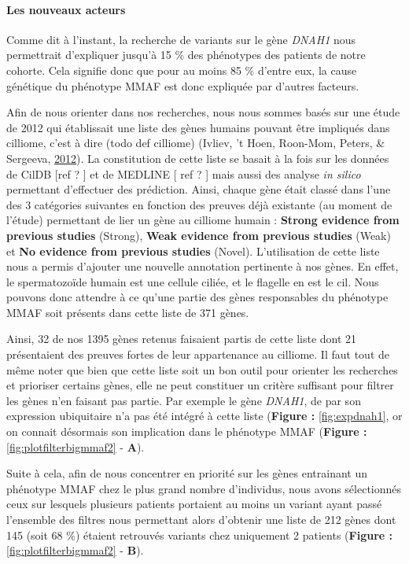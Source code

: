 \documentclass[12pt,twoside]{reedthesis}
\theoremstyle{definition}
\theoremstyle{definition}
\theoremstyle{remark}
\begin{document}
  \paragraph{Les nouveaux acteurs}\label{les-nouveaux-acteurs}
  
  Comme dit à l'instant, la recherche de variants sur le gène \emph{DNAH1}
  nous permettrait d'expliquer jusqu'à 15 \% des phénotypes des patients
  de notre cohorte. Cela signifie donc que pour au moins 85 \% d'entre
  eux, la cause génétique du phénotype MMAF est donc expliquée par
  d'autres facteurs.
  
  Afin de nous orienter dans nos recherches, nous nous sommes basés sur
  une étude de 2012 qui établissait une liste des gènes humains pouvant
  être impliqués dans cilliome, c'est à dire (todo def cilliome) (Ivliev,
  't Hoen, Roon-Mom, Peters, \& Sergeeva,
  \protect\hyperlink{ref-Ivliev2012}{2012}). La constitution de cette
  liste se basait à la fois sur les données de CilDB {[}ref ? {]} et de
  MEDLINE {[} ref ? {]} mais aussi des analyse \emph{in silico} permettant
  d'effectuer des prédiction. Ainsi, chaque gène était classé dans l'une
  des 3 catégories suivantes en fonction des preuves déjà existante (au
  moment de l'étude) permettant de lier un gène au cilliome humain :
  \textbf{Strong evidence from previous studies} (Strong), \textbf{Weak
  evidence from previous studies} (Weak) et \textbf{No evidence from
  previous studies} (Novel). L'utilisation de cette liste nous a permis
  d'ajouter une nouvelle annotation pertinente à nos gènes. En effet, le
  spermatozoïde humain est une cellule ciliée, et le flagelle en est le
  cil. Nous pouvons donc attendre à ce qu'une partie des gènes
  responsables du phénotype MMAF soit présents dans cette liste de 371
  gènes.
  
  Ainsi, 32 de nos 1395 gènes retenus faisaient partis de cette liste dont
  21 présentaient des preuves fortes de leur appartenance au cilliome. Il
  faut tout de même noter que bien que cette liste soit un bon outil pour
  orienter les recherches et prioriser certains gènes, elle ne peut
  constituer un critère suffisant pour filtrer les gènes n'en faisant pas
  partie. Par exemple le gène \emph{DNAH1}, de par son expression
  ubiquitaire n'a pas été intégré à cette liste (\textbf{Figure :
  }\ref{fig:expdnah1}, or on connait désormais son implication dans le
  phénotype MMAF (\textbf{Figure : }\ref{fig:plotfilterbigmmaf2} -
  \textbf{A}).
  
  Suite à cela, afin de nous concentrer en priorité sur les gènes
  entrainant un phénotype MMAF chez le plus grand nombre d'individus, nous
  avons sélectionnés ceux sur lesquels plusieurs patients portaient au
  moins un variant ayant passé l'ensemble des filtres nous permettant
  alors d'obtenir une liste de 212 gènes dont 145 (soit 68 \%) étaient
  retrouvés variants chez uniquement 2 patients (\textbf{Figure :
  }\ref{fig:plotfilterbigmmaf2} - \textbf{B}).
  
\end{document}
